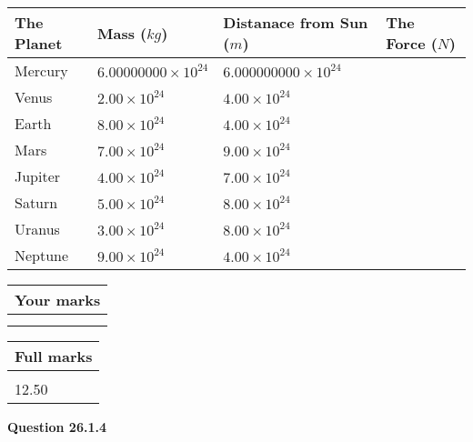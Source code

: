 \documentclass[12pt]{article}
\begin{document}
\vspace{0.2in}
 
 
\begin{tabular}{|l|l|l|l|}
\hline
The Planet & Mass ($kg$) & Distanace from Sun ($m$) & The Force ($N$)\\
\hline
Mercury  &
           $ %
6.00000000 \times 10^{24} $   &
             $ %
6.000000000 \times 10^{24} $    &
\\  \hline
Venus    &
           $ %
2.00 \times 10^{24} $    &
             $ %
4.00 \times 10^{24} $    &
\\  \hline
Earth    &
           $ %
8.00 \times 10^{24} $    &
             $ %
4.00 \times 10^{24} $    &
\\   \hline
Mars     &
           $ %
7.00 \times 10^{24} $    &
             $ %
9.00 \times 10^{24} $    &
\\   \hline
Jupiter  &
           $ %
4.00 \times 10^{24} $    &
             $ %
7.00 \times 10^{24} $    &
\\  \hline
Saturn   &
           $ %
5.00 \times 10^{24}$    &
             $ %
8.00 \times 10^{24}$    &
\\  \hline
Uranus   &
           $ %
3.00 \times 10^{24} $    &
             $ %
8.00 \times 10^{24} $    &
\\  \hline
Neptune  &
           $ %
9.00 \times 10^{24} $    &
             $ %
4.00 \times 10^{24} $    &
\\  \hline
 
\end{tabular}
 
 

 
 

 
\vspace{0.3in}
  
\vspace{0.2in}
  
         \begin{tabular}{|l|}
\hline
 Your marks  \\
\hline
 \\ 
 \\ 
\hline
\end{tabular}
\hspace{0.05in} \begin{tabular}{|l|}
\hline
 Full marks  \\
\hline
 \\ 
12.50 \\
\hline
\end{tabular}
{\textbf{\Large{Question
26.1.4 
}}}
  
\end{document}

